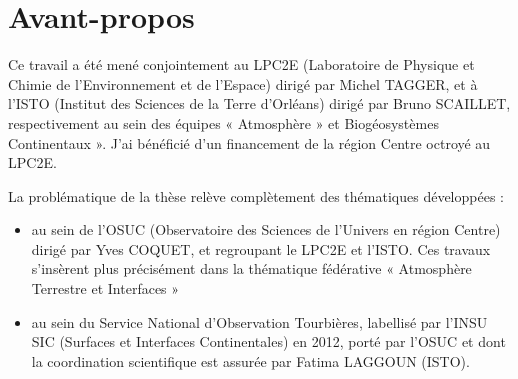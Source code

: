 
\chapter{Avant-propos}

Ce travail a été mené conjointement au LPC2E (Laboratoire de Physique et Chimie de l’Environnement et de l’Espace) dirigé par Michel TAGGER, et à l'ISTO (Institut des Sciences de la Terre d’Orléans) dirigé par Bruno SCAILLET, respectivement au sein des équipes « Atmosphère » et Biogéosystèmes Continentaux ». J'ai bénéficié d’un financement de la région Centre octroyé au LPC2E. 

La problématique de la thèse relève complètement des thématiques développées :
\begin{itemize}
\item au sein de l’OSUC (Observatoire des Sciences de l’Univers en région Centre) dirigé par Yves COQUET, et regroupant le LPC2E et l’ISTO. Ces travaux s’insèrent plus précisément dans la thématique fédérative « Atmosphère Terrestre et Interfaces »
\item au sein du Service National d’Observation Tourbières, labellisé par l’INSU SIC (Surfaces et Interfaces Continentales) en 2012, porté par l’OSUC et dont la coordination scientifique est assurée par Fatima LAGGOUN (ISTO).
\end{itemize}
